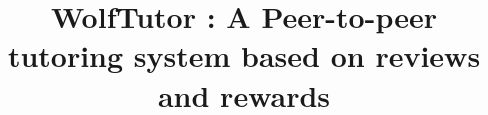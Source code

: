 \documentclass{sig-alternate-05-2015}
\begin{document}






%

\title{{\ttlit WolfTutor} : A Peer-to-peer tutoring system based on reviews and rewards}
%
%
%
%
%
\end{document}

